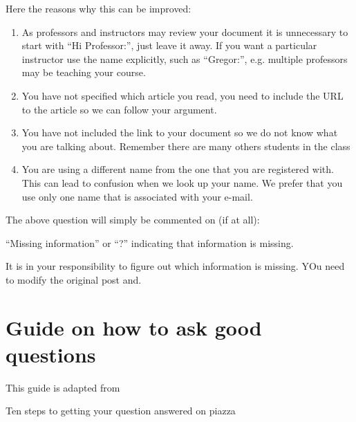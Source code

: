 Here the reasons why this can be improved:

\begin{enumerate}
\item
  As professors and instructors may review your document it is
  unnecessary to start with ``Hi Professor:'', just leave it away. If
  you want a particular instructor use the name explicitly, such as
  ``Gregor:'', e.g. multiple professors may be teaching your course.
\item
  You have not specified which article you read, you need to include the
  URL to the article so we can follow your argument.
\item
  You have not included the link to your document so we do not know what
  you are talking about. Remember there are many others students in the
  class
\item
  You are using a different name from the one that you are registered
  with. This can lead to confusion when we look up your name. We prefer
  that you use only one name that is associated with your e-mail.
\end{enumerate}

The above question will simply be commented on (if at all):

``Missing information'' or ``?'' indicating that information is missing.

It is in your responsibility to figure out which information is
missing. YOu need to modify the original post and.

\section{Guide on how to ask good questions}

This guide is adapted from


Ten steps to getting your question answered on piazza

